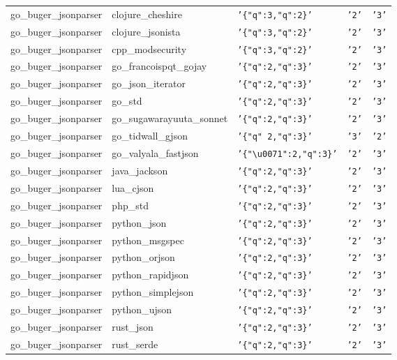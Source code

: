 \documentclass[english, 12pt, a4paper, sci, utf8, a-2b, online]{aaltothesis}
\def\str#1{\texttt{'#1'}}
\begin{document}
\begin{longtable}{lllll}
    go\_buger\_jsonparser & clojure\_cheshire & \str{\{"q":3,"q":2\}} & \str{2} & \str{3} \\
    go\_buger\_jsonparser & clojure\_jsonista & \str{\{"q":3,"q":2\}} & \str{2} & \str{3} \\
    go\_buger\_jsonparser & cpp\_modsecurity & \str{\{"q":3,"q":2\}} & \str{2} & \str{3} \\
    go\_buger\_jsonparser & go\_francoispqt\_gojay & \str{\{"q":2,"q":3\}} & \str{2} & \str{3} \\
    go\_buger\_jsonparser & go\_json\_iterator & \str{\{"q":2,"q":3\}} & \str{2} & \str{3} \\
    go\_buger\_jsonparser & go\_std & \str{\{"q":2,"q":3\}} & \str{2} & \str{3} \\
    go\_buger\_jsonparser & go\_sugawarayuuta\_sonnet & \str{\{"q":2,"q":3\}} & \str{2} & \str{3} \\
    go\_buger\_jsonparser & go\_tidwall\_gjson & \str{\{"q" 2,"q":3\}} & \str{3} & \str{2} \\
    go\_buger\_jsonparser & go\_valyala\_fastjson & \str{\{"\textbackslash u0071":2,"q":3\}} & \str{2} & \str{3} \\
    go\_buger\_jsonparser & java\_jackson & \str{\{"q":2,"q":3\}} & \str{2} & \str{3} \\
    go\_buger\_jsonparser & lua\_cjson & \str{\{"q":2,"q":3\}} & \str{2} & \str{3} \\
    go\_buger\_jsonparser & php\_std & \str{\{"q":2,"q":3\}} & \str{2} & \str{3} \\
    go\_buger\_jsonparser & python\_json & \str{\{"q":2,"q":3\}} & \str{2} & \str{3} \\
    go\_buger\_jsonparser & python\_msgspec & \str{\{"q":2,"q":3\}} & \str{2} & \str{3} \\
    go\_buger\_jsonparser & python\_orjson & \str{\{"q":2,"q":3\}} & \str{2} & \str{3} \\
    go\_buger\_jsonparser & python\_rapidjson & \str{\{"q":2,"q":3\}} & \str{2} & \str{3} \\
    go\_buger\_jsonparser & python\_simplejson & \str{\{"q":2,"q":3\}} & \str{2} & \str{3} \\
    go\_buger\_jsonparser & python\_ujson & \str{\{"q":2,"q":3\}} & \str{2} & \str{3} \\
    go\_buger\_jsonparser & rust\_json & \str{\{"q":2,"q":3\}} & \str{2} & \str{3} \\
    go\_buger\_jsonparser & rust\_serde & \str{\{"q":2,"q":3\}} & \str{2} & \str{3} \\

\end{longtable}
\end{document}
